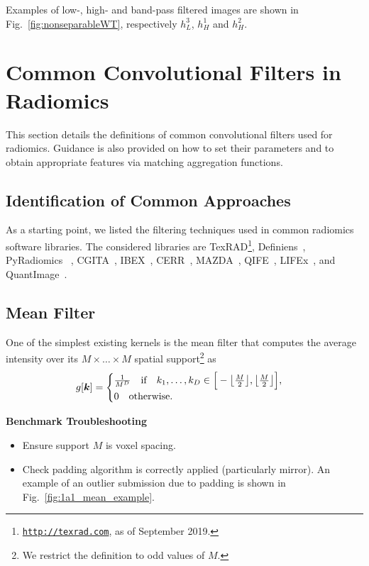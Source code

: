 \documentclass[fleqn,a4paper,oneside,openany]{book}
\DeclarePairedDelimiter\floor{\lfloor}{\rfloor}
\begin{document}
Examples of low-, high- and band-pass filtered images are shown in Fig.~\ref{fig:nonseparableWT}, respectively $h_L^3$, $h_H^1$ and $h_H^2$.
%
\chapter{Common Convolutional Filters in Radiomics}\label{sec:filtersDescription}
%
This section details the definitions of common convolutional filters used for radiomics. Guidance is also provided on how to set their parameters and to obtain appropriate features via matching aggregation functions.
%
\section{Identification of Common Approaches}
%
As a starting point, we listed the filtering techniques used in common radiomics software libraries. 
The considered libraries are TexRAD\footnote{\texttt{\url{http://texrad.com}}, as of September 2019.}, Definiens~\cite{BGW2014}, PyRadiomics~\cite{Van_Griethuysen2017-qp} , CGITA~\cite{FLS2014}, IBEX~\cite{ZFF2015}, CERR~\cite{Apte2018-sf}, MAZDA~\cite{SzK2017}, QIFE~\cite{EBR2017}, LIFEx~\cite{Nioche2018-jr}, and QuantImage~\cite{DCS2017}.
%
\section{Mean Filter} \label{subsec:meanFilter}
%
One of the simplest existing kernels is the mean filter that computes the average intensity over its $M\times\dots\times M$ spatial support\footnote{We restrict the definition to odd values of $M$.} as
%
\begin{equation}\label{eq:meanFilter}
g[\boldsymbol{k}]= 
\begin{cases}
\frac{1}{M^D} \quad\text{if}\quad k_1,\dots,k_D \in  \Big[ -\floor*{\frac{M}{2}},\floor*{\frac{M}{2}} \Big],\\
0\quad\text{otherwise}.
\end{cases}
\end{equation}
%

\vspace{2mm}
\begin{tcolorbox}[width=150mm, halign=left, colframe=black, colback=white, boxsep=0mm,arc=3mm]
\textbf{Benchmark Troubleshooting}
\begin{itemize}
\itemsep0em 
\item Ensure support $M$ is voxel spacing. 
\item Check padding algorithm is correctly applied (particularly mirror). An example of an outlier submission due to padding is shown in Fig.\ \ref{fig:1a1_mean_example}.
\end{itemize}
\end{tcolorbox}
\end{document}
